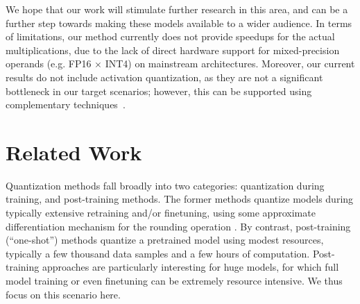 We hope that our work will stimulate further research in this area, and can be a further step towards making these models available to a wider audience. In terms of limitations, our method currently does not provide speedups for the actual multiplications, due to the lack of direct hardware support for mixed-precision operands (e.g. FP16 $\times$ INT4) on mainstream architectures. Moreover, our current results do not include activation quantization, as they are not a significant bottleneck in our target scenarios; however, this can be supported using complementary techniques~\cite{dettmers2022llm, yao2022zeroquant}. 

\section{Related Work}

Quantization methods fall broadly into two categories: quantization during training, and post-training methods. The former methods quantize models during typically extensive retraining and/or finetuning, using some approximate differentiation mechanism for the rounding operation \cite{gholami2021survey, nagel2021white}. By contrast, post-training (``one-shot'') methods quantize a pretrained model using modest resources, typically a few thousand data samples and a few hours of computation. Post-training approaches are particularly interesting for huge models, for which full model training or even finetuning can be extremely resource intensive. We thus focus on this scenario here. 

